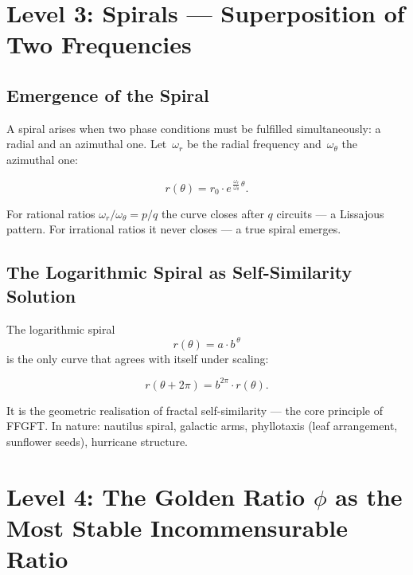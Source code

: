 \section{Level 3: Spirals — Superposition of Two Frequencies}

\subsection{Emergence of the Spiral}

A spiral arises when two phase conditions must be fulfilled
simultaneously: a radial and an azimuthal one. Let~$\omega_r$ be the
radial frequency and~$\omega_\theta$ the azimuthal one:

\begin{equation}
  r(\theta) = r_0 \cdot e^{\,\frac{\omega_r}{\omega_\theta}\,\theta}.
\end{equation}

For rational ratios $\omega_r/\omega_\theta = p/q$ the curve closes
after $q$ circuits — a Lissajous pattern.
For irrational ratios it never closes — a true spiral emerges.

\subsection{The Logarithmic Spiral as Self-Similarity Solution}

The logarithmic spiral
\begin{equation}
  r(\theta) = a \cdot b^{\,\theta}
\end{equation}
is the only curve that agrees with itself under scaling:

\begin{equation}
  r(\theta + 2\pi) = b^{2\pi} \cdot r(\theta).
\end{equation}

It is the geometric realisation of fractal self-similarity —
the core principle of FFGFT. In nature: nautilus spiral, galactic
arms, phyllotaxis (leaf arrangement, sunflower seeds), hurricane
structure.

\section{Level 4: The Golden Ratio $\phi$ as the Most Stable
         Incommensurable Ratio}

